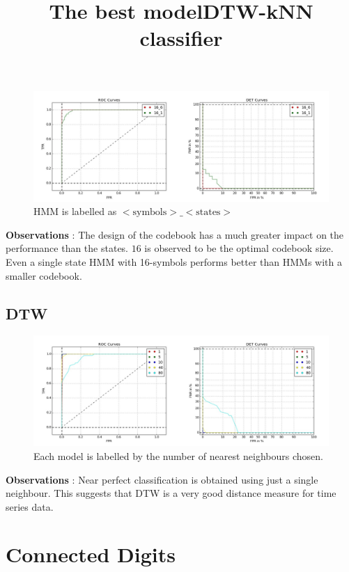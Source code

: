 \documentclass{article}
\begin{document}
\begin{figure}[h!]
\centering
\title{The best model}
\includegraphics[width=\textwidth]{isolated_digits/plots/hmm/roc_det_final.jpg}
\caption{HMM is labelled as $<\text{symbols}>\_<\text{states}>$}
\end{figure}

\newpage
\textbf{Observations} : The design of the codebook has a much greater impact on the performance than the states. $16$ is observed to be the optimal codebook size. Even a single state HMM with 16-symbols performs better than HMMs with a smaller codebook. 

\subsection{DTW}

\begin{figure}[h!]
\centering
\title{DTW-kNN classifier}
\includegraphics[width=\textwidth]{isolated_digits/plots/dtw/roc_det.jpg}
\caption{Each model is labelled by the number of nearest neighbours chosen.}
\end{figure}

\textbf{Observations} : Near perfect classification is obtained using just a single neighbour. This suggests that DTW is a very good distance measure for time series data.

\newpage
\section{Connected Digits}
\end{document}
